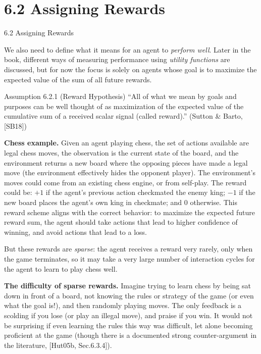 \documentclass[aspectratio=169,10pt]{beamer}
\begin{document}
\section{6.2 Assigning Rewards}

\begin{frame}[allowframebreaks]{6.2 Assigning Rewards}

We also need to define what it means for an agent to \emph{perform well}.
Later in the book, different ways of measuring performance using
\emph{utility functions} are discussed, but for now the focus is solely on
agents whose goal is to maximize the expected value of the sum of all
future rewards.

\begin{block}{Assumption 6.2.1 (Reward Hypothesis)}
``All of what we mean by goals and purposes can be well thought of as
maximization of the expected value of the cumulative sum of a received
scalar signal (called reward).'' (Sutton \& Barto, [SB18])
\end{block}

\textbf{Chess example.} Given an agent playing chess, the set of actions
available are legal chess moves, the observation is the current state of
the board, and the environment returns a new board where the opposing
pieces have made a legal move (the environment effectively hides the
opponent player). The environment's moves could come from an existing chess
engine, or from self-play. The reward could be: $+1$ if the agent's
previous action checkmated the enemy king; $-1$ if the new board places the
agent's own king in checkmate; and $0$ otherwise. This reward scheme aligns
with the correct behavior: to maximize the expected future reward sum, the
agent should take actions that lead to higher confidence of winning, and
avoid actions that lead to a loss.

\vspace{0.2cm}
But these rewards are \emph{sparse}: the agent receives a reward very
rarely, only when the game terminates, so it may take a very large number
of interaction cycles for the agent to learn to play chess well.

\framebreak

\textbf{The difficulty of sparse rewards.} Imagine trying to learn chess by
being sat down in front of a board, not knowing the rules or strategy of
the game (or even what the goal is!), and then randomly playing moves. The
only feedback is a scolding if you lose (or play an illegal move), and
praise if you win. It would not be surprising if even learning the rules
this way was difficult, let alone becoming proficient at the game (though
there is a documented strong counter-argument in the literature, [Hut05b,
Sec.6.3.4]).


\end{frame}
\end{document}
